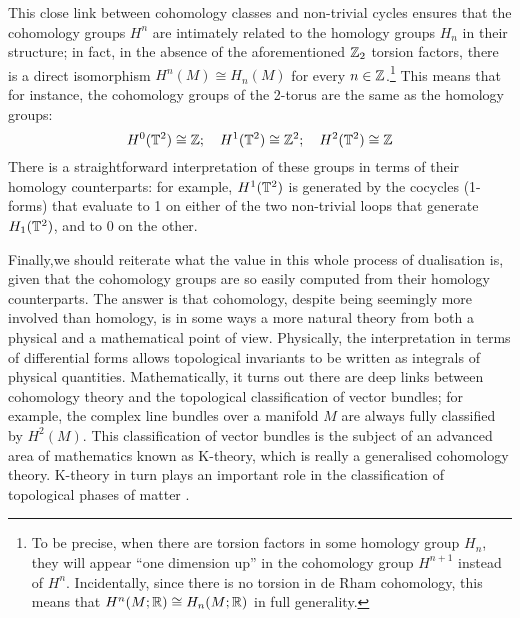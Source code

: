 This close link between cohomology classes and non-trivial cycles ensures that the cohomology groups $H^n$ are intimately related to the homology groups $H_n$ in their structure; in fact, in the absence of the aforementioned $\mathbb{Z}_2$ torsion factors, there is a direct isomorphism $H^n(M)\cong H_n(M)$ for every $n\in\mathbb{Z}$.\footnote{
	To be precise, when there are torsion factors in some homology group $H_n$, they will appear ``one dimension up'' in the cohomology group $H^{n+1}$ instead of $H^n$. Incidentally, since there is no torsion in de Rham cohomology, this means that $H^n(M;\mathbb{R}) \cong H_n(M;\mathbb{R})$ in full generality.}
This means that for instance, the cohomology groups of the 2-torus are the same as the homology groups:
\begin{equation*}
	H^0(\mathbb{T}^2) \cong \mathbb{Z};\quad H^1(\mathbb{T}^2) \cong \mathbb{Z}^2;\quad H^2(\mathbb{T}^2)\cong \mathbb{Z}
\end{equation*}
There is a straightforward interpretation of these groups in terms of their homology counterparts: for example, $H^1(\mathbb{T}^2)$ is generated by the cocycles (1-forms) that evaluate to 1 on either of the two non-trivial loops that generate $H_1(\mathbb{T}^2)$, and to 0 on the other.

Finally,we should reiterate what the value in this whole process of dualisation is, given that the cohomology groups are so easily computed from their homology counterparts. The answer is that cohomology, despite being seemingly more involved than homology, is in some ways a more natural theory from both a physical and a mathematical point of view. Physically, the interpretation in terms of differential forms allows topological invariants to be written as integrals of physical quantities. Mathematically, it turns out there are deep links between cohomology theory and the topological classification of vector bundles; for example, the complex line bundles over a manifold $M$ are always fully classified by $H^2(M)$. This classification of vector bundles is the subject of an advanced area of mathematics known as K-theory, which is really a generalised cohomology theory. K-theory in turn plays an important role in the classification of topological phases of matter \cite{FreedMoore_K-theory,Thiang_K-theory}.